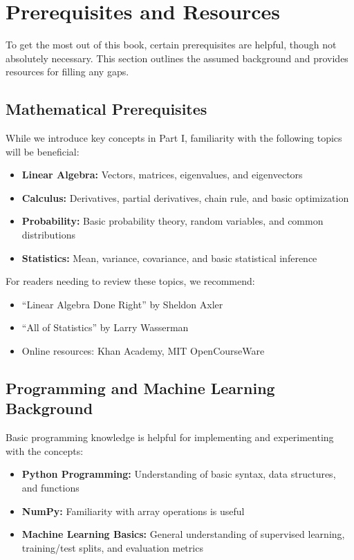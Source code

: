
\section{Prerequisites and Resources}
\label{sec:prerequisites}

To get the most out of this book, certain prerequisites are helpful, though not absolutely necessary. This section outlines the assumed background and provides resources for filling any gaps.

\subsection{Mathematical Prerequisites}

While we introduce key concepts in Part I, familiarity with the following topics will be beneficial:

\begin{itemize}
    \item \textbf{Linear Algebra:} Vectors, matrices, eigenvalues, and eigenvectors
    \item \textbf{Calculus:} Derivatives, partial derivatives, chain rule, and basic optimization
    \item \textbf{Probability:} Basic probability theory, random variables, and common distributions
    \item \textbf{Statistics:} Mean, variance, covariance, and basic statistical inference
\end{itemize}

For readers needing to review these topics, we recommend:
\begin{itemize}
    \item ``Linear Algebra Done Right'' by Sheldon Axler
    \item ``All of Statistics'' by Larry Wasserman
    \item Online resources: Khan Academy, MIT OpenCourseWare
\end{itemize}

\subsection{Programming and Machine Learning Background}

Basic programming knowledge is helpful for implementing and experimenting with the concepts:

\begin{itemize}
    \item \textbf{Python Programming:} Understanding of basic syntax, data structures, and functions
    \item \textbf{NumPy:} Familiarity with array operations is useful
    \item \textbf{Machine Learning Basics:} General understanding of supervised learning, training/test splits, and evaluation metrics
\end{itemize}


